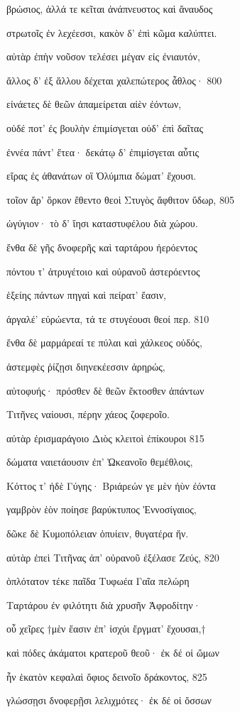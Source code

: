 βρώσιος, ἀλλά τε κεῖται ἀνάπνευστος καὶ ἄναυδος

στρωτοῖς ἐν λεχέεσσι, κακὸν δ' ἐπὶ κῶμα καλύπτει.

αὐτὰρ ἐπὴν νοῦσον τελέσει μέγαν εἰς ἐνιαυτόν,

ἄλλος δ' ἐξ ἄλλου δέχεται χαλεπώτερος ἆθλος· 800 

εἰνάετες δὲ θεῶν ἀπαμείρεται αἰὲν ἐόντων,

οὐδέ ποτ' ἐς βουλὴν ἐπιμίσγεται οὐδ' ἐπὶ δαῖτας

ἐννέα πάντ' ἔτεα· δεκάτῳ δ' ἐπιμίσγεται αὖτις 

εἴρας ἐς ἀθανάτων οἳ Ὀλύμπια δώματ' ἔχουσι. 

τοῖον ἄρ' ὅρκον ἔθεντο θεοὶ Στυγὸς ἄφθιτον ὕδωρ, 805 

ὠγύγιον· τὸ δ' ἵησι καταστυφέλου διὰ χώρου. 

ἔνθα δὲ γῆς δνοφερῆς καὶ ταρτάρου ἠερόεντος 

πόντου τ' ἀτρυγέτοιο καὶ οὐρανοῦ ἀστερόεντος

ἑξείης πάντων πηγαὶ καὶ πείρατ' ἔασιν, 

ἀργαλέ' εὐρώεντα, τά τε στυγέουσι θεοί περ. 810

ἔνθα δὲ μαρμάρεαί τε πύλαι καὶ χάλκεος οὐδός, 

ἀστεμφὲς ῥίζῃσι διηνεκέεσσιν ἀρηρώς, 

αὐτοφυής· πρόσθεν δὲ θεῶν ἔκτοσθεν ἁπάντων 

Τιτῆνες ναίουσι, πέρην χάεος ζοφεροῖο. 

αὐτὰρ ἐρισμαράγοιο Διὸς κλειτοὶ ἐπίκουροι 815

δώματα ναιετάουσιν ἐπ' Ὠκεανοῖο θεμέθλοις,

Κόττος τ' ἠδὲ Γύγης· Βριάρεών γε μὲν ἠὺν ἐόντα 

γαμβρὸν ἑὸν ποίησε βαρύκτυπος Ἐννοσίγαιος,

δῶκε δὲ Κυμοπόλειαν ὀπυίειν, θυγατέρα ἥν.

αὐτὰρ ἐπεὶ Τιτῆνας ἀπ' οὐρανοῦ ἐξέλασε Ζεύς, 820 

ὁπλότατον τέκε παῖδα Τυφωέα Γαῖα πελώρη

Ταρτάρου ἐν φιλότητι διὰ χρυσῆν Ἀφροδίτην· 

οὗ χεῖρες †μὲν ἔασιν ἐπ' ἰσχύι ἔργματ' ἔχουσαι,†

καὶ πόδες ἀκάματοι κρατεροῦ θεοῦ· ἐκ δέ οἱ ὤμων 

ἦν ἑκατὸν κεφαλαὶ ὄφιος δεινοῖο δράκοντος, 825 

γλώσσῃσι δνοφερῇσι λελιχμότες· ἐκ δέ οἱ ὄσσων 

